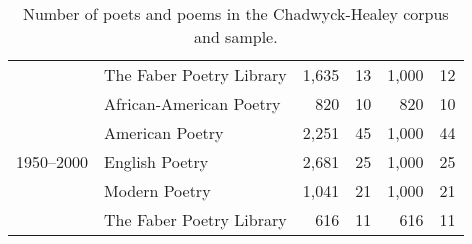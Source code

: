 \begin{table}[t]
{\begin{tabular}{llrrrr}
   & The Faber Poetry Library & 1,635 & 13 & 1,000 & 12 \\
  \cline{1-6}
  \multirow[t]{5}{*}{1950--2000} & African-American Poetry & 820 & 10 & 820 & 10 \\
   & American Poetry & 2,251 & 45 & 1,000 & 44 \\
   & English Poetry & 2,681 & 25 & 1,000 & 25 \\
   & Modern Poetry & 1,041 & 21 & 1,000 & 21 \\
   & The Faber Poetry Library & 616 & 11 & 616 & 11 \\
  \bottomrule
  \end{tabular}
  }
  \caption{Number of poets and poems in the Chadwyck-Healey corpus and sample.}
  \label{tab:num_poems_corpus}
\end{table}